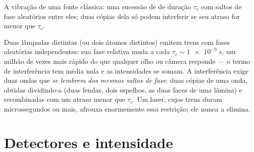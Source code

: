 \begin{omfigure}

{\small A vibração de uma fonte clássica: uma sucessão de  de duração $\tau_c$ com saltos de fase aleatórios entre eles; duas
cópias dela só podem interferir se seu atraso for menor que $\tau_c$.}
\end{omfigure}

\begin{remark}\label{rem:b2:scalar-light-model:twosources}
Duas lâmpadas distintas (ou dois átomos distintos) emitem trens com
fases aleatórias independentes: sua fase relativa muda a cada $\tau_c
\sim \qty{1e-9}{s}$, um milhão de vezes mais rápido do que qualquer olho ou câmera
responde --- o termo de interferência tem média nula e as
intensidades se somam. A interferência exige duas ondas que \emph{se lembrem dos
mesmos saltos de fase}: duas cópias de uma onda, obtidas dividindo-a
(duas fendas, dois espelhos, as duas faces de uma lâmina) e recombinadas com um
atraso menor que $\tau_c$. Um laser, cujos trens duram microssegundos ou
mais, afrouxa enormemente essa restrição; ele nunca a elimina.
\end{remark}

\section{Detectores e intensidade}

